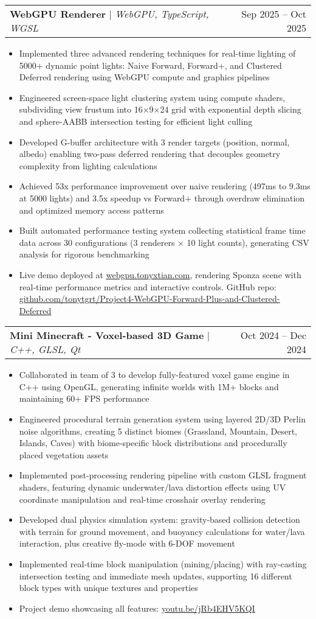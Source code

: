 \documentclass[letterpaper,11pt]{article}
\makeatletter
\newcommand{\resumeItem}[1]{
  \item\small{
    {#1 \vspace{-3pt}}
  }
}
\newcommand{\resumeProjectHeading}[2]{
    \item
    \begin{tabular*}{0.97\textwidth}{l@{\extracolsep{\fill}}r}
      \small#1 & #2 \\
    \end{tabular*}\vspace{-7pt}
}
\newcommand{\resumeItemListStart}{\begin{itemize}}
\newcommand{\resumeItemListEnd}{\end{itemize}\vspace{-5pt}}
\makeatother
\begin{document}
\resumeProjectHeading
      {\textbf{WebGPU Renderer} $|$ \emph{WebGPU, TypeScript, WGSL}}{Sep 2025 -- Oct 2025}
      \resumeItemListStart
      \resumeItem{Implemented three advanced rendering techniques for real-time lighting of 5000+ dynamic point lights: Naive Forward, Forward+, and Clustered Deferred rendering using WebGPU compute and graphics pipelines}
      \resumeItem{Engineered screen-space light clustering system using compute shaders, subdividing view frustum into 16×9×24 grid with exponential depth slicing and sphere-AABB intersection testing for efficient light culling}
      \resumeItem{Developed G-buffer architecture with 3 render targets (position, normal, albedo) enabling two-pass deferred rendering that decouples geometry complexity from lighting calculations}
      \resumeItem{Achieved 53x performance improvement over naive rendering (497ms to 9.3ms at 5000 lights) and 3.5x speedup vs Forward+ through overdraw elimination and optimized memory access patterns}
      \resumeItem{Built automated performance testing system collecting statistical frame time data across 30 configurations (3 renderers × 10 light counts), generating CSV analysis for rigorous benchmarking}
      \resumeItem{Live demo deployed at \href{http://webgpu.tonyxtian.com}{\uline{webgpu.tonyxtian.com}}, rendering Sponza scene with real-time performance metrics and interactive controls. GitHub repo: \href{https://github.com/tonytgrt/Project4-WebGPU-Forward-Plus-and-Clustered-Deferred}{\uline{github.com/tonytgrt/Project4-WebGPU-Forward-Plus-and-Clustered-Deferred}}}
      \resumeItemListEnd
      
\resumeProjectHeading
      {\textbf{Mini Minecraft - Voxel-based 3D Game} $|$ \emph{C++, GLSL, Qt}}{Oct 2024 -- Dec 2024}
      \resumeItemListStart
      \resumeItem{Collaborated in team of 3 to develop fully-featured voxel game engine in C++ using OpenGL, generating infinite worlds with 1M+ blocks and maintaining 60+ FPS performance}
      \resumeItem{Engineered procedural terrain generation system using layered 2D/3D Perlin noise algorithms, creating 5 distinct biomes (Grassland, Mountain, Desert, Islands, Caves) with biome-specific block distributions and procedurally placed vegetation assets}
      \resumeItem{Implemented post-processing rendering pipeline with custom GLSL fragment shaders, featuring dynamic underwater/lava distortion effects using UV coordinate manipulation and real-time crosshair overlay rendering}
      \resumeItem{Developed dual physics simulation system: gravity-based collision detection with terrain for ground movement, and buoyancy calculations for water/lava interaction, plus creative fly-mode with 6-DOF movement}
      \resumeItem{Implemented real-time block manipulation (mining/placing) with ray-casting intersection testing and immediate mesh updates, supporting 16 different block types with unique textures and properties}
      \resumeItem{Project demo showcasing all features: \href{https://youtu.be/jRb4EHV5KQI}{\uline{youtu.be/jRb4EHV5KQI}}}
      \resumeItemListEnd
\end{document}
